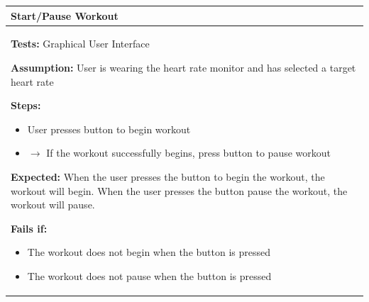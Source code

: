 \documentclass[letterpaper,english, 12pt]{scrreprt}
\begin{document}
\begin{center}
        \begin{tabular}{|C{15cm}|}
                \hline
                        \textbf{Start/Pause Workout}\\
                \hline
                        \begin{flushleft}
                                \textbf{Tests: } Graphical User Interface
                        \end{flushleft}
                        \begin{flushleft}
                                \textbf{Assumption: } User is wearing the heart rate monitor and has selected a target heart rate
                        \end{flushleft}
                        \begin{flushleft}
                                \textbf{Steps:}
                        \end{flushleft}
				\begin{itemize}
					\item User presses button to begin workout
					\item $\rightarrow$ If the workout successfully begins, press button to pause workout
				\end{itemize}
			\begin{flushleft}
				\textbf{Expected: } When the user presses the button to begin the workout, the workout will begin. When the user presses the button pause the workout, the workout will pause.
			\end{flushleft}
                        \begin{flushleft}
                                \textbf{Fails if: }
                        \end{flushleft}
                                \begin{itemize}
                                        \item The workout does not begin when the button is pressed
					\item The workout does not pause when the button is pressed
                                \end{itemize}
				\\
		\hline
        \end{tabular}
\end{center}
\end{document}
